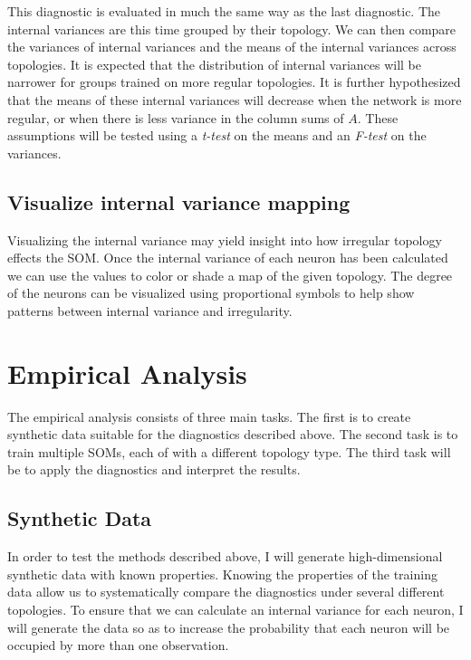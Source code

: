 This diagnostic is evaluated in much the same way as the last diagnostic.  
The internal variances are this time grouped by their topology.  We can then
compare the variances of internal variances and the means of the internal
variances across topologies.  It is expected that the distribution of internal
variances will be narrower for groups trained on more regular topologies.
It is further hypothesized that the means of these internal variances will
decrease when the network is more regular, or when there is less variance in
the column sums of $A$.  These assumptions will be tested using
a \emph{t-test} on the means and an \emph{F-test} on the variances.

\subsection{Visualize internal variance mapping}
Visualizing the internal variance may yield insight into how irregular topology
effects the SOM.  Once the internal variance of each neuron has been calculated
we can use the values to color or shade a map of the given topology.  The degree
of the neurons can be visualized using proportional symbols to help show
patterns between internal variance and irregularity.

\section{Empirical Analysis}
The empirical analysis consists of three main tasks.  The first is to create
synthetic data suitable for the diagnostics described above.  The second task is
to train multiple SOMs, each of with a different topology type. The third task
will be to apply the diagnostics and interpret the results.

\subsection{Synthetic Data}
In order to test the methods described above, I will generate high-dimensional
synthetic data with known properties.  Knowing the properties of the training
data allow us to systematically compare the diagnostics under several different
topologies.  To ensure that we can calculate an internal variance for each
neuron, I will generate the data so as to increase the probability that each
neuron will be occupied by more than one observation.

